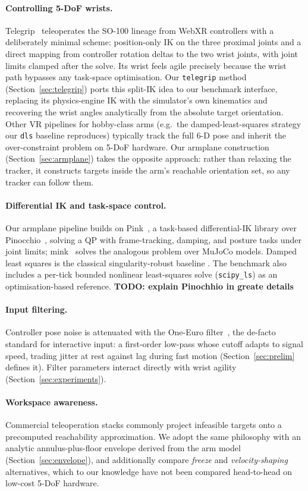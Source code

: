 \paragraph{Controlling 5-DoF wrists.}
Telegrip~\citep{telegrip} teleoperates the SO-100 lineage from WebXR
controllers with a deliberately minimal scheme: position-only IK on the
three proximal joints and a direct mapping from controller rotation
deltas to the two wrist joints, with joint limits clamped after the
solve. Its wrist feels agile precisely because the wrist path bypasses
any task-space optimisation. Our \texttt{telegrip} method
(Section~\ref{sec:telegrip}) ports this split-IK idea to our benchmark
interface, replacing its physics-engine IK with the simulator's own
kinematics and recovering the wrist angles analytically from the
absolute target orientation. Other VR pipelines for hobby-class arms
(e.g.\ the damped-least-squares strategy our \texttt{dls} baseline
reproduces) typically track the full 6-D pose and inherit the
over-constraint problem on 5-DoF hardware. Our armplane construction
(Section~\ref{sec:armplane}) takes the opposite approach: rather than
relaxing the tracker, it constructs targets inside the arm's reachable
orientation set, so any tracker can follow them.

\paragraph{Differential IK and task-space control.}
Our armplane pipeline builds on Pink~\citep{pink}, a task-based
differential-IK library over Pinocchio~\citep{pinocchio}, solving a QP
with frame-tracking, damping, and posture tasks under joint limits;
mink~\citep{mink} solves the analogous problem over MuJoCo models.
Damped least squares is the classical singularity-robust baseline
\citep{wampler1986,nakamura1986}. The benchmark also includes a per-tick
bounded nonlinear least-squares solve (\texttt{scipy\_ls}) as an
optimisation-based reference. \textbf{TODO: explain Pinochhio in greate details}

\paragraph{Input filtering.}
Controller pose noise is attenuated with the One-Euro
filter~\citep{oneeuro}, the de-facto standard for interactive input: a
first-order low-pass whose cutoff adapts to signal speed, trading jitter
at rest against lag during fast motion (Section~\ref{sec:prelim} defines
it). Filter parameters interact directly with wrist agility
(Section~\ref{sec:experiments}).

\paragraph{Workspace awareness.}
Commercial teleoperation stacks commonly project infeasible targets onto
a precomputed reachability approximation. We adopt the same philosophy
with an analytic annulus-plus-floor envelope derived from the arm model
(Section~\ref{sec:envelope}), and additionally compare \emph{freeze} and
\emph{velocity-shaping} alternatives, which to our knowledge have not
been compared head-to-head on low-cost 5-DoF hardware.
